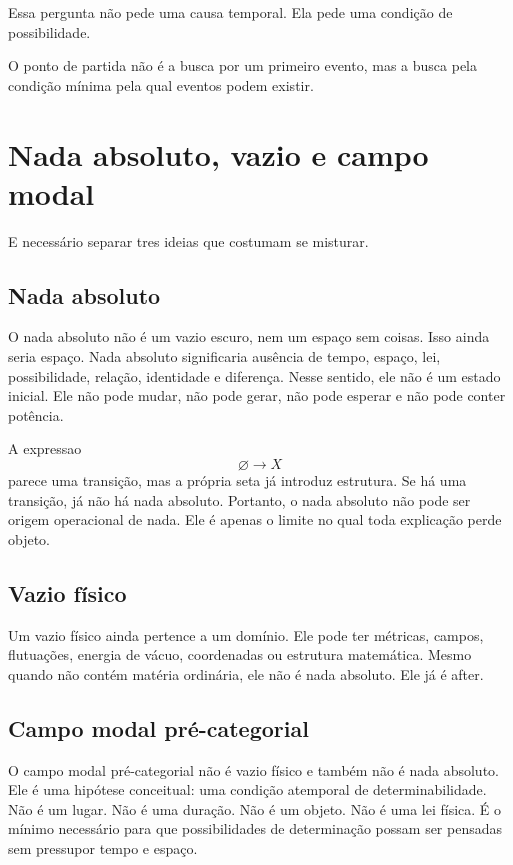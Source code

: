 \documentclass[11pt,a4paper]{article}
\newenvironment{claimbox}{\begin{framed}\small}{\end{framed}}
\begin{document}
Essa pergunta não pede uma causa temporal. Ela pede uma condição de possibilidade.

\begin{claimbox}
O ponto de partida não é a busca por um primeiro evento, mas a busca pela condição mínima pela qual eventos podem existir.
\end{claimbox}

\section{Nada absoluto, vazio e campo modal}

E necessário separar tres ideias que costumam se misturar.

\subsection{Nada absoluto}

O nada absoluto não é um vazio escuro, nem um espaço sem coisas. Isso ainda seria espaço. Nada absoluto significaria ausência de tempo, espaço, lei, possibilidade, relação, identidade e diferença. Nesse sentido, ele não é um estado inicial. Ele não pode mudar, não pode gerar, não pode esperar e não pode conter potência.

A expressao
\[
\varnothing \to X
\]
parece uma transição, mas a própria seta já introduz estrutura. Se há uma transição, já não há nada absoluto. Portanto, o nada absoluto não pode ser origem operacional de nada. Ele é apenas o limite no qual toda explicação perde objeto.

\subsection{Vazio físico}

Um vazio físico ainda pertence a um domínio. Ele pode ter métricas, campos, flutuações, energia de vácuo, coordenadas ou estrutura matemática. Mesmo quando não contém matéria ordinária, ele não é nada absoluto. Ele já é after.

\subsection{Campo modal pré-categorial}

O campo modal pré-categorial não é vazio físico e também não é nada absoluto. Ele é uma hipótese conceitual: uma condição atemporal de determinabilidade. Não é um lugar. Não é uma duração. Não é um objeto. Não é uma lei física. É o mínimo necessário para que possibilidades de determinação possam ser pensadas sem pressupor tempo e espaço.
\end{document}
